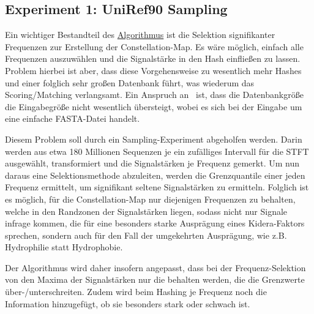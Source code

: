     \subsection{Experiment 1: UniRef90 Sampling} %
        \label{sub:experiment_1_uniref90_sampling}
        Ein wichtiger Bestandteil des \hyperref[sec:grundalgorithmus]{Algorithmus} ist die Selektion signifikanter Frequenzen zur Erstellung der Constellation-Map. Es wäre möglich, einfach alle Frequenzen auszuwählen und die Signalstärke in den Hash einfließen zu lassen. Problem hierbei ist aber, dass diese Vorgehensweise zu wesentlich mehr Hashes und einer folglich sehr großen Datenbank führt, was wiederum das Scoring/Matching verlangsamt. Ein Anspruch an \protfin\ ist, dass die Datenbankgröße die Eingabegröße nicht wesentlich übersteigt, wobei es sich bei der Eingabe um eine einfache FASTA-Datei handelt.

        Diesem Problem soll durch ein Sampling-Experiment abgeholfen werden. Darin werden aus etwa 180 Millionen Sequenzen je ein zufälliges Intervall für die STFT ausgewählt, transformiert und die Signalstärken je Frequenz gemerkt. Um nun daraus eine Selektionsmethode abzuleiten, werden die Grenzquantile einer jeden Frequenz ermittelt, um signifikant seltene Signalstärken zu ermitteln. Folglich ist es möglich, für die Constellation-Map nur diejenigen Frequenzen zu behalten, welche in den Randzonen der Signalstärken liegen, sodass nicht nur Signale infrage kommen, die für eine besonders starke Ausprägung eines Kidera-Faktors sprechen, sondern auch für den Fall der umgekehrten Ausprägung, wie z.B. Hydrophilie statt Hydrophobie.

        Der Algorithmus wird daher insofern angepasst, dass bei der Frequenz-Selektion von den Maxima der Signalstärken nur die behalten werden, die die Grenzwerte über-/unterschreiten. Zudem wird beim Hashing je Frequenz noch die Information hinzugefügt, ob sie besonders stark oder schwach ist.
    
